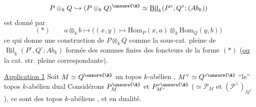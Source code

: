 \[
P\otimes_kQ\hookrightarrow(P\otimes_kQ)^{\unsure{\&}}
\simeq\underline{\operatorname{Bil}}_k(P^\circ,Q^\circ;(Ab_k))
\]
est donné par
\[
(*)\qquad a\otimes_kb\longmapsto
\big((x,y)\longmapsto\mathrm{Hom}_P(x,a)\otimes_k\mathrm{Hom}_Q(y,b)\big)
\]
ce qui donne une construction  de
$P\otimes_kQ$ comme la sous-cat. pleine de
$\underline{\operatorname{Bil}}_k(P^\circ,Q^\circ;Ab_k)$
formée des sommes finies des foncteurs de la forme $(*)$
(\uline{ou} la cat. str. pleine correspondante).

\uline{Application 1} Soit $M\simeq Q^{\unsure{\&}}$ un topos $k$-abélien ,
$M^\vee\simeq Q^{\circ\unsure{\&}}$ ``le'' topos $k$-abélien  dual
Considérons $P_M^{\unsure{\&}}$ et $P_{M^\vee}^{\circ\unsure{\&}}$
($\simeq\mathcal P_M$ et $(\mathcal P^\vee)_{M^\vee}$),
ce sont des topos $k$-abéliens , et en dualité.

